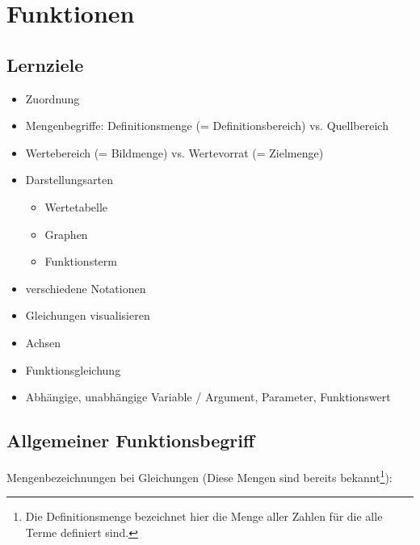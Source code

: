 
\section{Funktionen}
\subsection*{Lernziele}

\begin{itemize}
 \item Zuordnung
 \item Mengenbegriffe: Definitionsmenge (= Definitionsbereich) vs. Quellbereich
 \item Wertebereich (= Bildmenge) vs. Wertevorrat (= Zielmenge)
 \item Darstellungsarten
   \begin{itemize}
      \item Wertetabelle
      \item Graphen
      \item Funktionsterm
   \end{itemize}
 \item verschiedene Notationen
 \item Gleichungen visualisieren
 \item Achsen
 \item Funktionsgleichung
 \item Abhängige, unabhängige Variable / Argument, Parameter, Funktionswert
\end{itemize}


\newpage
\subsection{Allgemeiner Funktionsbegriff}
Mengenbezeichnungen bei Gleichungen (Diese Mengen sind bereits
bekannt\footnote{Die Definitionsmenge bezeichnet hier die Menge aller
  Zahlen für die alle Terme definiert sind.}):


